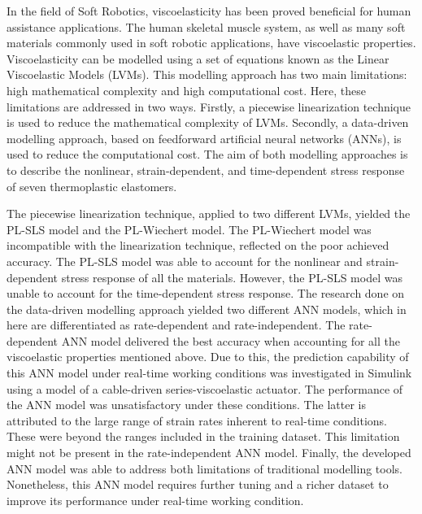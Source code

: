 


\begin{abstracts}        %



In the field of Soft Robotics, viscoelasticity has been proved beneficial for human assistance applications. The human skeletal muscle system, as well as many soft materials commonly used in soft robotic applications, have viscoelastic properties. Viscoelasticity can be modelled using a set of equations known as the Linear Viscoelastic Models (LVMs). This modelling approach has two main limitations: high mathematical complexity and high computational cost. Here, these limitations are addressed in two ways. Firstly, a piecewise linearization technique is used to reduce the mathematical complexity of LVMs. Secondly, a data-driven modelling approach, based on feedforward artificial neural networks (ANNs), is used to reduce the computational cost. The aim of both modelling approaches is to describe the nonlinear, strain-dependent, and time-dependent stress response of seven thermoplastic elastomers.

The piecewise linearization technique, applied to two different LVMs, yielded the PL-SLS model and the PL-Wiechert model. The PL-Wiechert model was incompatible with the linearization technique, reflected on the poor achieved accuracy. The PL-SLS model was able to account for the nonlinear and strain-dependent stress response of all the materials. However, the PL-SLS model was unable to account for the time-dependent stress response. The research done on the data-driven modelling approach yielded two different ANN models, which in here are differentiated as rate-dependent and rate-independent. The rate-dependent ANN model delivered the best accuracy when accounting for all the viscoelastic properties mentioned above. Due to this, the prediction capability of this ANN model under real-time working conditions was investigated in Simulink using a model of a cable-driven series-viscoelastic actuator. The performance of the ANN model was unsatisfactory under these conditions. The latter is attributed to the large range of strain rates inherent to real-time conditions. These were beyond the ranges included in the training dataset. This limitation might not be present in the rate-independent ANN model. Finally, the developed ANN model was able to address both limitations of traditional modelling tools. Nonetheless, this ANN model requires further tuning and a richer dataset to improve its performance under real-time working condition.



\end{abstracts}

